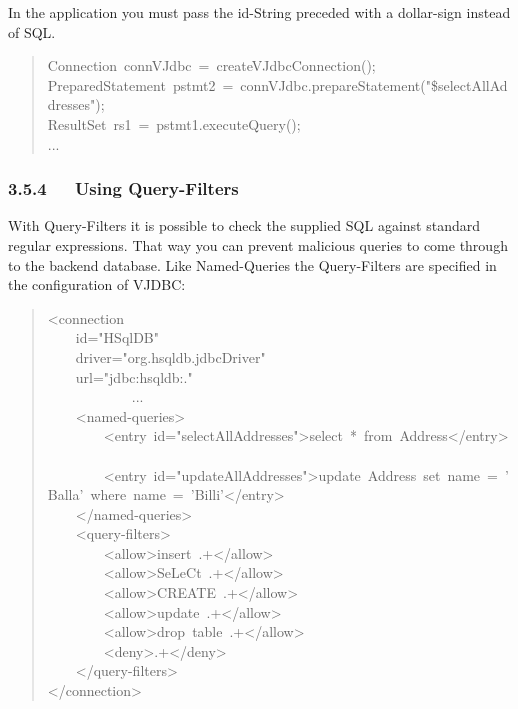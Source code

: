 \documentclass[10pt,a4paper,english]{article}
\begin{document}
In the application you must pass the id-String preceded with a dollar-sign instead of SQL.
\begin{quote}{\ttfamily \raggedright \noindent
Connection~connVJdbc~=~createVJdbcConnection();~\\
PreparedStatement~pstmt2~=~connVJdbc.prepareStatement("{\$}selectAllAddresses");~\\
ResultSet~rs1~=~pstmt1.executeQuery();~\\
...
}\end{quote}



\hypertarget{using-query-filters}{}
\subsubsection*{3.5.4~~~Using Query-Filters}

With Query-Filters it is possible to check the supplied SQL against standard regular expressions. That way you can prevent malicious queries to come through to the backend database. Like Named-Queries the Query-Filters are specified in the configuration of VJDBC:
\begin{quote}{\ttfamily \raggedright \noindent
<connection~\\
~~~~id="HSqlDB"~\\
~~~~driver="org.hsqldb.jdbcDriver"~\\
~~~~url="jdbc:hsqldb:."~\\
~~~~~~~~~~~~...~\\
~~~~<named-queries>~\\
~~~~~~~~<entry~id="selectAllAddresses">select~*~from~Address</entry>~\\
~~~~~~~~<entry~id="updateAllAddresses">update~Address~set~name~=~'Balla'~where~name~=~'Billi'</entry>~\\
~~~~</named-queries>~\\
~~~~<query-filters>~\\
~~~~~~~~<allow>insert~.+</allow>~\\
~~~~~~~~<allow>SeLeCt~.+</allow>~\\
~~~~~~~~<allow>CREATE~.+</allow>~\\
~~~~~~~~<allow>update~.+</allow>~\\
~~~~~~~~<allow>drop~table~.+</allow>~\\
~~~~~~~~<deny>.+</deny>~\\
~~~~</query-filters>~\\
</connection>
}\end{quote}
\end{document}

